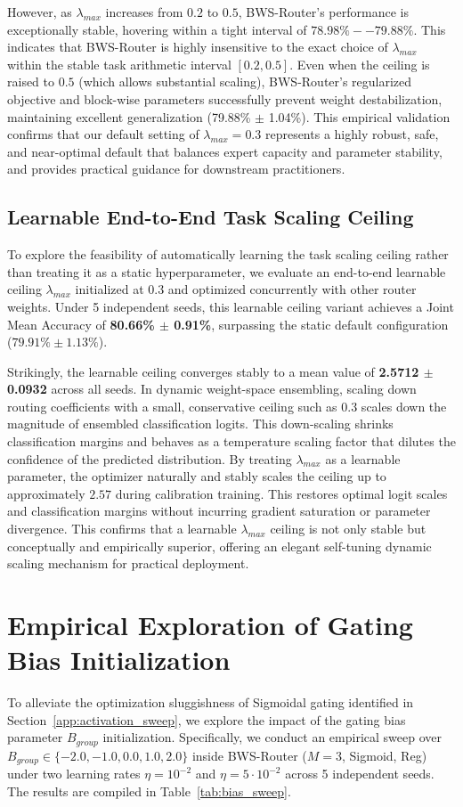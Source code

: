 However, as $\lambda_{max}$ increases from $0.2$ to $0.5$, BWS-Router's performance is exceptionally stable, hovering within a tight interval of $78.98\%--79.88\%$. This indicates that BWS-Router is highly insensitive to the exact choice of $\lambda_{max}$ within the stable task arithmetic interval $[0.2, 0.5]$. Even when the ceiling is raised to $0.5$ (which allows substantial scaling), BWS-Router's regularized objective and block-wise parameters successfully prevent weight destabilization, maintaining excellent generalization (79.88\% $\pm$ 1.04\%). This empirical validation confirms that our default setting of $\lambda_{max} = 0.3$ represents a highly robust, safe, and near-optimal default that balances expert capacity and parameter stability, and provides practical guidance for downstream practitioners.

\subsection{Learnable End-to-End Task Scaling Ceiling}
To explore the feasibility of automatically learning the task scaling ceiling rather than treating it as a static hyperparameter, we evaluate an end-to-end learnable ceiling $\lambda_{max}$ initialized at $0.3$ and optimized concurrently with other router weights. Under 5 independent seeds, this learnable ceiling variant achieves a Joint Mean Accuracy of \textbf{80.66\% $\pm$ 0.91\%}, surpassing the static default configuration ($79.91\% \pm 1.13\%$). 

Strikingly, the learnable ceiling converges stably to a mean value of \textbf{2.5712 $\pm$ 0.0932} across all seeds. In dynamic weight-space ensembling, scaling down routing coefficients with a small, conservative ceiling such as $0.3$ scales down the magnitude of ensembled classification logits. This down-scaling shrinks classification margins and behaves as a temperature scaling factor that dilutes the confidence of the predicted distribution. By treating $\lambda_{max}$ as a learnable parameter, the optimizer naturally and stably scales the ceiling up to approximately $2.57$ during calibration training. This restores optimal logit scales and classification margins without incurring gradient saturation or parameter divergence. This confirms that a learnable $\lambda_{max}$ ceiling is not only stable but conceptually and empirically superior, offering an elegant self-tuning dynamic scaling mechanism for practical deployment.

\section{Empirical Exploration of Gating Bias Initialization}
\label{app:bias_sweep}
To alleviate the optimization sluggishness of Sigmoidal gating identified in Section~\ref{app:activation_sweep}, we explore the impact of the gating bias parameter $B_{group}$ initialization. Specifically, we conduct an empirical sweep over $B_{group} \in \{-2.0, -1.0, 0.0, 1.0, 2.0\}$ inside BWS-Router ($M=3$, Sigmoid, Reg) under two learning rates $\eta = 10^{-2}$ and $\eta = 5 \cdot 10^{-2}$ across 5 independent seeds. The results are compiled in Table~\ref{tab:bias_sweep}.

